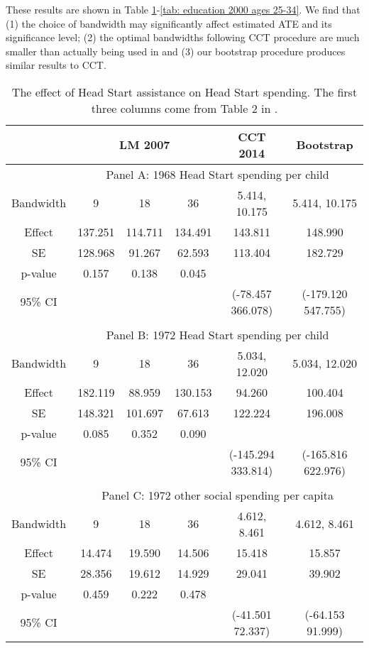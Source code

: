 \documentclass[12pt,fleqn]{article}
\begin{document}
These results are shown in Table \ref{tab: head start spending}-\ref{tab: education 2000 ages 25-34}. We find that (1) the choice of bandwidth may significantly affect estimated ATE and its significance level; (2) the optimal bandwidths following CCT procedure are much smaller than actually being used in \cite{ludwig2007} and (3) our bootstrap procedure produces similar results to CCT.

\begin{table}[ht]
	\centering
	\begin{tabular}{cccccc}
		\toprule
		& \multicolumn{3}{c}{LM 2007} & CCT 2014 & Bootstrap \\
		\midrule
		& \multicolumn{5}{c}{Panel A: 1968 Head Start spending per child} \\ 
		Bandwidth & 9 & 18 & 36 & 5.414, 10.175 & 5.414, 10.175 \\
		Effect    & 137.251 & 114.711 & 134.491 & 143.811 & 148.990 \\
		SE        & 128.968 & 91.267  & 62.593 & 113.404 & 182.729 \\
		p-value   & 0.157   & 0.138   & 0.045  & & \\
		95\% CI   & & & & (-78.457 366.078) & (-179.120  547.755) \\
		
		&&&&& \\
		& \multicolumn{5}{c}{Panel B: 1972 Head Start spending per child} \\ 
		Bandwidth & 9 & 18 & 36 & 5.034, 12.020 & 5.034, 12.020 \\
		Effect    & 182.119 & 88.959 & 130.153 & 94.260 & 100.404 \\
		SE        & 148.321 & 101.697 & 67.613 & 122.224 & 196.008 \\
		p-value   & 0.085   & 0.352   & 0.090  & & \\
		95\% CI   & & & & (-145.294 333.814) & (-165.816 622.976) \\
		
		&&&&& \\
		& \multicolumn{5}{c}{Panel C: 1972 other social spending per capita} \\ 
		Bandwidth & 9 & 18 & 36 & 4.612, 8.461 & 4.612, 8.461 \\
		Effect    & 14.474 & 19.590 & 14.506 & 15.418 & 15.857 \\
		SE        & 28.356 & 19.612 & 14.929 & 29.041 & 39.902 \\
		p-value   & 0.459   & 0.222   & 0.478  & & \\
		95\% CI   & & & & (-41.501 72.337) & (-64.153 91.999) \\
		\bottomrule
	\end{tabular}
	\caption{The effect of Head Start assistance on Head Start spending. The first three columns come from Table 2 in \cite{ludwig2007}.}
	\label{tab: head start spending}
\end{table}
\end{document}
